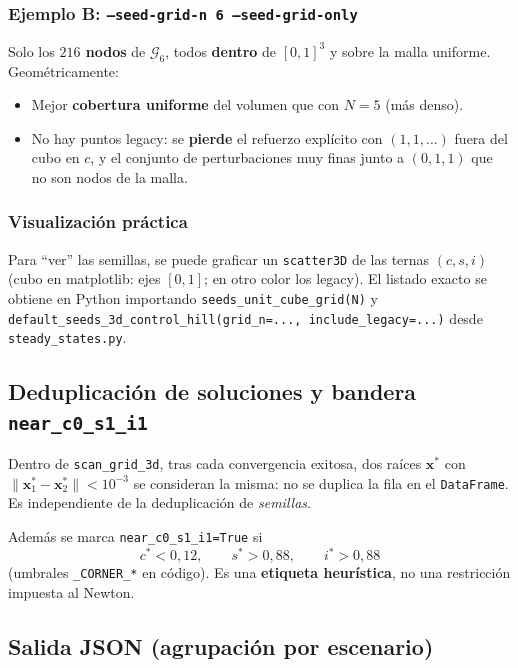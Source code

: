 \documentclass[11pt,a4paper]{article}
\begin{document}
\subsubsection*{Ejemplo B: \texttt{--seed-grid-n 6 --seed-grid-only}}

Solo los \textbf{$216$ nodos} de $\mathcal{G}_6$, todos \textbf{dentro} de $[0,1]^3$ y sobre la malla uniforme. Geométricamente:
\begin{itemize}[leftmargin=*]
  \item Mejor \textbf{cobertura uniforme} del volumen que con $N=5$ (más denso).
  \item No hay puntos legacy: se \textbf{pierde} el refuerzo explícito con $(1{,}1,\ldots)$ fuera del cubo en $c$, y el conjunto de perturbaciones muy finas junto a $(0,1,1)$ que no son nodos de la malla.
\end{itemize}

\subsubsection*{Visualización práctica}

Para ``ver'' las semillas, se puede graficar un \texttt{scatter3D} de las ternas $(c,s,i)$ (cubo en matplotlib: ejes $[0,1]$; en otro color los legacy). El listado exacto se obtiene en Python importando \texttt{seeds\_unit\_cube\_grid(N)} y \texttt{default\_seeds\_3d\_control\_hill(grid\_n=..., include\_legacy=...)} desde \texttt{steady\_states.py}.

\subsection{Deduplicación de \textbf{soluciones} y bandera \texttt{near\_c0\_s1\_i1}}

Dentro de \texttt{scan\_grid\_3d}, tras cada convergencia exitosa, dos raíces $\mathbf{x}^\ast$ con $\|\mathbf{x}^\ast_1-\mathbf{x}^\ast_2\|<10^{-3}$ se consideran la misma: no se duplica la fila en el \texttt{DataFrame}. Es independiente de la deduplicación de \emph{semillas}.

Además se marca \texttt{near\_c0\_s1\_i1=True} si
\[
c^\ast<0{,}12,\qquad s^\ast>0{,}88,\qquad i^\ast>0{,}88
\]
(umbrales \texttt{\_CORNER\_*} en código). Es una \textbf{etiqueta heurística}, no una restricción impuesta al Newton.

\subsection{Salida JSON (agrupación por escenario)}
\end{document}
